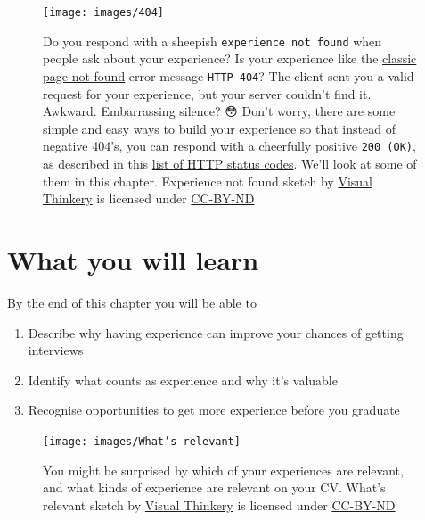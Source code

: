 \documentclass[
]{book}
\providecommand{\tightlist}{%
  \setlength{\itemsep}{0pt}\setlength{\parskip}{0pt}}
\begin{document}
\begin{figure}

{\centering \texttt{[image: images/404]} 

}

\caption{Do you respond with a sheepish \texttt{experience\ not\ found} when people ask about your experience? Is your experience like the \href{https://en.wikipedia.org/wiki/HTTP_404}{classic page not found} error message \texttt{HTTP\ 404}? The client sent you a valid request for your experience, but your server couldn't find it. Awkward. Embarrassing silence? 😳 Don't worry, there are some simple and easy ways to build your experience so that instead of negative 404's, you can respond with a cheerfully positive \texttt{200\ (OK)}, as described in this \href{https://en.wikipedia.org/wiki/List_of_HTTP_status_codes}{list of HTTP status codes}. We'll look at some of them in this chapter. Experience not found sketch by \href{https://visualthinkery.com/}{Visual Thinkery} is licensed under \href{https://creativecommons.org/licenses/by-nd/4.0/}{CC-BY-ND}}\label{fig:404-fig}
\end{figure}



\hypertarget{ilo5}{%
\section{What you will learn}\label{ilo5}}

By the end of this chapter you will be able to

\begin{enumerate}
\def\labelenumi{\arabic{enumi}.}
\tightlist
\item
  Describe why having experience can improve your chances of getting interviews
\item
  Identify what counts as experience and why it's valuable
\item
  Recognise opportunities to get more experience before you graduate
\end{enumerate}

\begin{figure}

{\centering \texttt{[image: images/What's relevant]} 

}

\caption{You might be surprised by which of your experiences are relevant, and what kinds of experience are relevant on your CV. What's relevant sketch by \href{https://visualthinkery.com/}{Visual Thinkery} is licensed under \href{https://creativecommons.org/licenses/by-nd/4.0/}{CC-BY-ND}}\label{fig:relevance-fig}
\end{figure}
\end{document}
